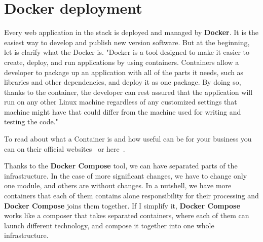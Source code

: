 \section{Docker deployment}\label{sec:docker-deployment}
Every web application in the stack is deployed and managed by \textbf{Docker}.
It is the easiest way to develop and publish new version software.
But at the beginning, let is clarify what the Docker is.
"Docker is a tool designed to make it easier to create, deploy, and run applications by using containers.
Containers allow a developer to package up an application with all of the parts it needs, such as libraries and other dependencies, and deploy it as one package.
By doing so, thanks to the container, the developer can rest assured that the application will run on any other Linux machine regardless of any customized settings that machine might have that could differ from the machine used for writing and testing the code."\cite{dockerDescription}

To read about what a Container is and how useful can be for your business you can on their official websites~\cite{dockerContainer} or here~\cite{dockerDescription}.

Thanks to the \textbf{Docker Compose} tool, we can have separated parts of the infrastructure.
In the case of more significant changes, we have to change only one module, and others are without changes.
In a nutshell, we have more containers that each of them contains alone responsibility for their processing and \textbf{Docker Compose} joins them together.
If I simplify it, \textbf{Docker Compose} works like a composer that takes separated containers, where each of them can launch different technology, and compose it together into one whole infrastructure.\cite{dockerCompose}
